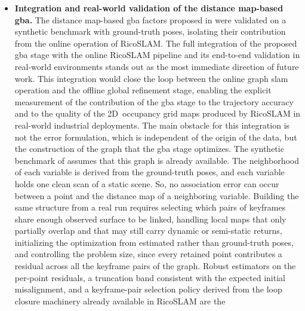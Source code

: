 \begin{itemize}
protocol. The occupancy distribution analysis of
 measures how decided the resulting map
becomes, but a sharper map does not prove that every discarded return was
truly dynamic, nor that no sparsely observed static structure was removed.
A manually labelled or independently surveyed static reference map would
enable reporting precision and recall of the removal decision, the rate of
falsely removed static returns, and the rate of missed dynamic returns,
turning the current evidence into a quantitative assessment of the
mechanism;
\item \textbf{Integration and real-world validation of the distance
map-based \gls{gba}.}
The distance map-based \gls{gba} factors proposed in
 were validated on a synthetic benchmark with
ground-truth poses, isolating their contribution from the online
operation of RicoSLAM. The full integration of the proposed \gls{gba}
stage with the online RicoSLAM pipeline and its end-to-end validation
in real-world environments stands out as the most immediate direction
of future work. This integration would close the loop between the
online graph \gls{slam} operation and the offline global refinement
stage, enabling the explicit measurement of the contribution of the
\gls{gba} stage to the trajectory accuracy and to the quality of the
2D~occupancy grid maps produced by RicoSLAM in real-world industrial
deployments.
The main obstacle for this integration is not the error formulation, which
is independent of the origin of the data, but the construction of the graph
that the \gls{gba} stage optimizes. The synthetic benchmark of
 assumes that this graph is already available.
The neighborhood of each variable is derived from the ground-truth poses, and
each variable holds one clean scan of a static scene. So, no association
error can occur between a point and the distance map of a neighboring
variable. Building the same structure from a real run requires selecting
which pairs of keyframes share enough observed surface to be linked, handling
local maps that only partially overlap and that may still carry dynamic or
semi-static returns, initializing the optimization from estimated rather than
ground-truth poses, and controlling the problem size, since every retained
point contributes a residual across all the keyframe pairs of the graph.
Robust estimators on the per-point residuals, a truncation band consistent
with the expected initial misalignment, and a keyframe-pair selection policy
derived from the loop closure machinery already available in RicoSLAM are the

\end{itemize}

